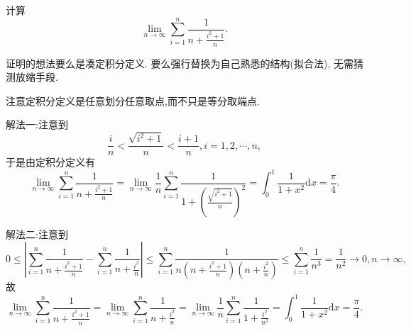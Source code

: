 \documentclass[../../main.tex]{subfiles}
\begin{document}
\begin{example}
计算
\[
\lim_{n\rightarrow\infty}\sum_{i = 1}^{n}\frac{1}{n+\frac{i^{2}+1}{n}}.
\]
\end{example}
\begin{note}
证明的想法要么是凑定积分定义. 要么强行替换为自己熟悉的结构(拟合法), 无需猜测放缩手段.
\end{note}
\begin{remark}
注意定积分定义是任意划分任意取点,而不只是等分取端点.
\end{remark}
\begin{solution}
{\color{blue}解法一:}注意到
\[
\frac{i}{n}<\frac{\sqrt{i^{2}+1}}{n}<\frac{i + 1}{n},i = 1,2,\cdots,n,
\]
于是由定积分定义有
\[
\lim_{n\rightarrow\infty}\sum_{i = 1}^{n}\frac{1}{n+\frac{i^{2}+1}{n}}=\lim_{n\rightarrow\infty}\frac{1}{n}\sum_{i = 1}^{n}\frac{1}{1+\left(\frac{\sqrt{i^{2}+1}}{n}\right)^{2}}=\int_{0}^{1}\frac{1}{1 + x^{2}}\mathrm{d}x=\frac{\pi}{4}.
\]

{\color{blue}解法二:}注意到
\[
0\leq\left|\sum_{i = 1}^{n}\frac{1}{n+\frac{i^{2}+1}{n}}-\sum_{i = 1}^{n}\frac{1}{n+\frac{i^{2}}{n}}\right|\leqslant\sum_{i = 1}^{n}\frac{1}{n\left(n+\frac{i^{2}+1}{n}\right)\left(n+\frac{i^{2}}{n}\right)}\leqslant\sum_{i = 1}^{n}\frac{1}{n^{3}}=\frac{1}{n^{2}}\rightarrow0,n\rightarrow\infty,
\]
故
\[
\lim_{n\rightarrow\infty}\sum_{i = 1}^{n}\frac{1}{n+\frac{i^{2}+1}{n}}=\lim_{n\rightarrow\infty}\sum_{i = 1}^{n}\frac{1}{n+\frac{i^{2}}{n}}=\lim_{n\rightarrow\infty}\frac{1}{n}\sum_{i = 1}^{n}\frac{1}{1+\frac{i^{2}}{n^{2}}}=\int_{0}^{1}\frac{1}{1 + x^{2}}\mathrm{d}x=\frac{\pi}{4}.
\]
\end{solution}
\end{document}
